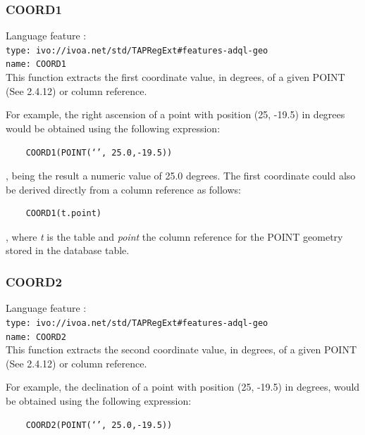 \documentclass[11pt,a4paper]{ivoa}
\begin{document}
\subsubsection{COORD1}
\label{sec:geom.functions.coord1}
{\footnotesize Language feature :}\\
{\footnotesize \verb|type: ivo://ivoa.net/std/TAPRegExt#features-adql-geo|}\\
{\footnotesize \verb|name: COORD1|}\\

This function extracts the first coordinate value, in degrees, of a given
POINT (See 2.4.12) or column reference.

For example, the right ascension of a point with position (25, -19.5) in
degrees would be obtained using the following expression:

\begin{verbatim}
    COORD1(POINT(‘’, 25.0,-19.5))
\end{verbatim}

, being the result a numeric value of 25.0 degrees. The first coordinate
could also be derived directly from a column reference as follows:

\begin{verbatim}
    COORD1(t.point)
\end{verbatim}
    
, where \textit{t} is the table and \textit{point} the column reference for
the POINT geometry stored in the database table.

\subsubsection{COORD2}
\label{sec:geom.functions.coord2}
{\footnotesize Language feature :}\\
{\footnotesize \verb|type: ivo://ivoa.net/std/TAPRegExt#features-adql-geo|}\\
{\footnotesize \verb|name: COORD2|}\\

This function extracts the second coordinate value, in degrees, of a given
POINT (See 2.4.12) or column reference.

For example, the declination of a point with position (25, -19.5) in degrees,
would be obtained using the following expression:

\begin{verbatim}
    COORD2(POINT(‘’, 25.0,-19.5))
\end{verbatim}
\end{document}
